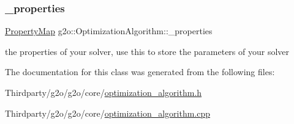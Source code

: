 \subsubsection{\texorpdfstring{\+\_\+properties}{\_properties}}
{\footnotesize\ttfamily \mbox{\hyperlink{classg2o_1_1_property_map}{Property\+Map}} g2o\+::\+Optimization\+Algorithm\+::\+\_\+properties\hspace{0.3cm}{\ttfamily [protected]}}



the properties of your solver, use this to store the parameters of your solver 



The documentation for this class was generated from the following files\+:\begin{DoxyCompactItemize}
\item 
Thirdparty/g2o/g2o/core/\mbox{\hyperlink{optimization__algorithm_8h}{optimization\+\_\+algorithm.\+h}}\item 
Thirdparty/g2o/g2o/core/\mbox{\hyperlink{optimization__algorithm_8cpp}{optimization\+\_\+algorithm.\+cpp}}\end{DoxyCompactItemize}
